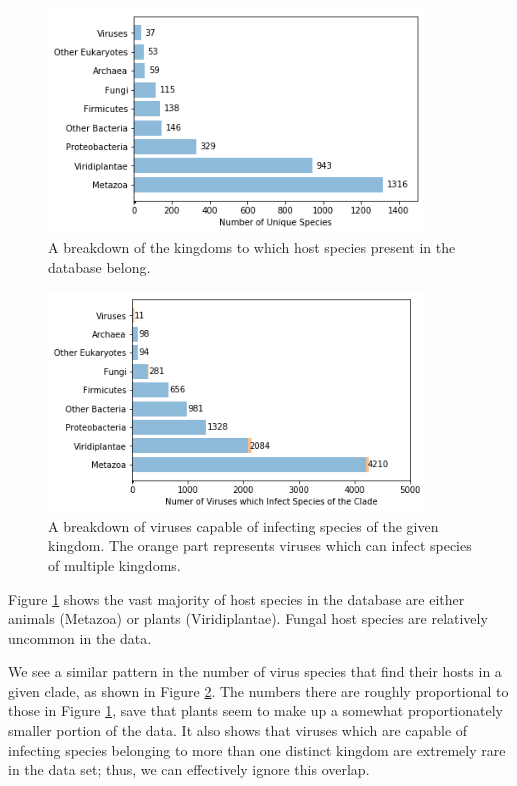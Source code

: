 \documentclass[12pt]{article}
\begin{document}
    \begin{figure}[H]
        \begin{center}
            \includegraphics[width=100mm]{host_clades_figure.png}
            \caption{A breakdown of the kingdoms to which host species present in
            the database belong.}
            \label{host_clades_figure}
        \end{center}
    \end{figure}
    \begin{figure}[H]
        \begin{center}
            \includegraphics[width=100mm]{infects_clades_figure.png}
            \caption{A breakdown of viruses capable of infecting species of
            the given kingdom. The orange part represents viruses which can
            infect species of multiple kingdoms.}
            \label{infects_clades_figure}
        \end{center}
    \end{figure}

    Figure \ref{host_clades_figure} shows the vast majority of host species in
    the database are either animals (Metazoa) or plants (Viridiplantae). Fungal
    host species are relatively uncommon in the data.

    We see a similar pattern in the number of virus species that find their
    hosts in a given clade, as shown in Figure \ref{infects_clades_figure}.
    The numbers there are roughly proportional to those in Figure
    \ref{host_clades_figure}, save that plants seem to make up a somewhat
    proportionately smaller portion of the data. It also shows that viruses
    which are capable of infecting species belonging to more than one distinct
    kingdom are extremely rare in the data set; thus, we can effectively ignore
    this overlap.
\end{document}
